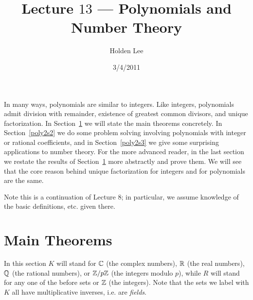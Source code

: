 
\pagestyle{fancy}




%
%

\title{Lecture $13$ --- Polynomials and Number Theory}%
\author{Holden Lee}
\date{3/4/2011}%
\maketitle
\thispagestyle{empty}

In many ways, polynomials are similar to integers. Like integers, polynomials admit division with remainder, existence of greatest common divisors, and unique factorization.
In Section~\ref{poly2s1} we will state the main theorems concretely. In Section~\ref{poly2s2} we do some problem solving involving polynomials with integer or rational coefficients, and in Section~\ref{poly2s3} we give some surprising applications to number theory. For the more advanced reader, in the last section we restate the results of Section~\ref{poly2s1} more abstractly and prove them. We will see that the core reason behind unique factorization for integers and for polynomials are the same.

Note this is a continuation of Lecture 8; in particular, we assume knowledge of the basic definitions, etc. given there. 

\section{Main Theorems}\label{poly2s1}
In this section $K$ will stand for $\mathbb{C}$ (the complex numbers), $\mathbb{R}$ (the real numbers), $\mathbb{Q}$ (the rational numbers), or $\mathbb{Z}/p\mathbb{Z}$ (the integers modulo $p$), while $R$ will stand for any one of the before sets or $\mathbb{Z}$ (the integers). Note that the sets we label with $K$ all have multiplicative inverses, i.e. are {\it fields}.

